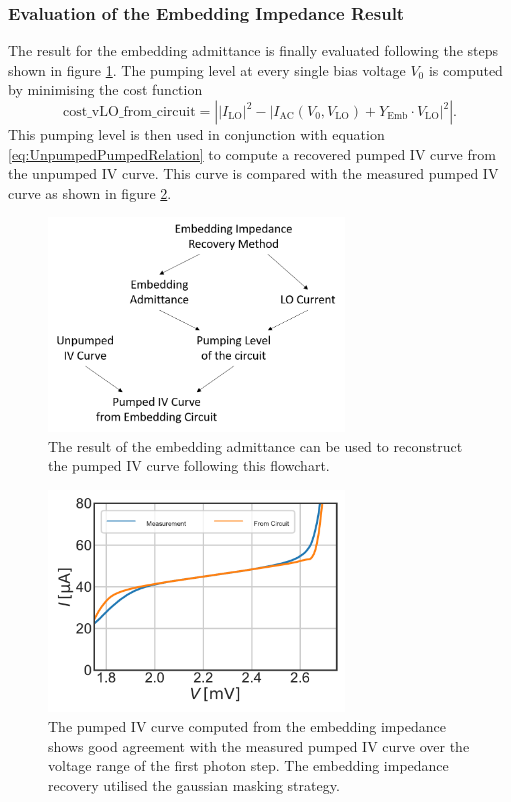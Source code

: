 \documentclass[]{article}
\begin{document}
\subsubsection{Evaluation of the Embedding Impedance Result}
The result for the embedding admittance is finally evaluated following the steps shown in figure \ref{fig:Result_Evaluation_Flowchart}.
The pumping level at every single bias voltage $V_0$ is computed by minimising the cost function
\begin{equation}\label{eq:cost_vLO_from_circuit}
\text{cost\_vLO\_from\_circuit} =  \left|\left|I_\text{LO}\right|^2 - \left|I_\text{AC}(V_0,V_\text{LO}) + Y_\text{Emb}\cdot V_\text{LO} \right|^2\right| .
\end{equation}
This pumping level is then used in conjunction with equation \ref{eq:UnpumpedPumpedRelation} to compute a recovered pumped IV curve from the unpumped IV curve. This curve is compared with the measured pumped IV curve as shown in figure \ref{fig:Pumped_Recovered}.


\begin{figure}
	\centering
	\includegraphics[width=0.7\textwidth]{./Images/Impedance_Recovery_Flowchart_Part2.png}
	\caption{The result of the embedding admittance can be used to reconstruct the pumped IV curve following this flowchart.}
	\label{fig:Result_Evaluation_Flowchart}
\end{figure}

\begin{figure}
	\centering
	\includegraphics[width=0.7\textwidth]{../Mixer_Unit_Test/2020_01_12_GausMask/Pumped_Recovered.pdf}
	\caption{The pumped IV curve computed from the embedding impedance shows good agreement with the measured pumped IV curve over the voltage range of the first photon step. The embedding impedance recovery utilised the gaussian masking strategy.}
	\label{fig:Pumped_Recovered}
\end{figure}
\end{document}
